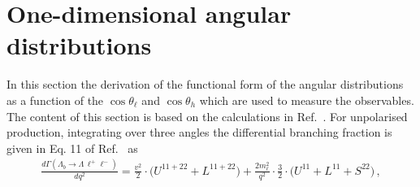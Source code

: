 \section{One-dimensional angular distributions}

In this section the derivation of the functional form of the angular distributions 
as a function of the $\cos\theta_\ell$ and $\cos\theta_h$ which are used to measure
the observables. The content of this section is based on the calculations in Ref.~\cite{Gutsche:2013pp}. 
For unpolarised \Lb production,
%
%
integrating over three angles the differential branching fraction is given in Eq. 11 of Ref.~\cite{Gutsche:2013pp} as
\begin{eqnarray}
\label{bjoint00}
\frac{d\Gamma(\Lambda_b \to \Lambda \,\ell^{+}\ell^{-})}{d q^2}=
\frac{v^{2}}{2}\cdot\bigg( U^{11+22} + L^{11+22} \bigg)
+\frac{2m_\ell^{2}}{q^{2}}\cdot\frac{3}{2}\cdot
\bigg( U^{11} + L^{11} + S^{22} \bigg)\,, 
\end{eqnarray}
